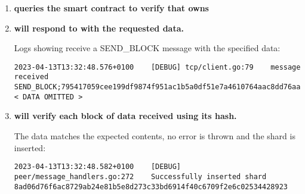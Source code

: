 \begin{enumerate}[itemsep=2.5pt]
  Logs showing  choose a block and send a request for it :

\begin{lstlisting}[breaklines=true, postbreak=\mbox{\textcolor{red}{$\hookrightarrow$}\space}]
2023-04-13T13:32:48.197+0100	[DEBUG]	games/download.go:339	Requesting file downloads\User WT-1.0\test.txt for game 795417059cee199df9874f951ac1b5a0df51e7a4610764aac8dd76aa3ff27664
2023-04-13T13:32:48.197+0100	[DEBUG]	games/download.go:343	Requesting shard 8ad06d76f6ac8729ab24e81b5e8d273c33bd6914f40c6709f2e6c02534428923 for file downloads\User WT-1.0\test.txt in game 795417059cee199df9874f951ac1b5a0df51e7a4610764aac8dd76aa3ff27664
...
2023-04-13T13:32:48.197+0100	[DEBUG]	peer/requests.go:14	Processing request for block 8ad06d76f6ac8729ab24e81b5e8d273c33bd6914f40c6709f2e6c02534428923
...
2023-04-13T13:32:48.197+0100	[DEBUG]	tcp/client.go:93	Sending BLOCK;795417059cee199df9874f951ac1b5a0df51e7a4610764aac8dd76aa3ff27664; 8ad06d76f6ac8729ab24e81b5e8d273c33bd6914f40c6709f2e6c02534428923
\end{lstlisting}

  \item\textbf{ queries the smart contract to verify that  owns }

  \item \textbf{ will respond to  with the requested data.}
  
  Logs showing  receive a SEND\_BLOCK message with the specified data:

\begin{lstlisting}[breaklines=true, postbreak=\mbox{\textcolor{red}{$\hookrightarrow$}\space}]
2023-04-13T13:32:48.576+0100	[DEBUG]	tcp/client.go:79	message received SEND_BLOCK;795417059cee199df9874f951ac1b5a0df51e7a4610764aac8dd76aa3ff27664;< DATA OMITTED >
\end{lstlisting}

  \item \textbf{ will verify each block of data received using its hash.}
  
  The data matches the expected contents, no error is thrown and the shard is inserted:
  
\begin{lstlisting}[breaklines=true, postbreak=\mbox{\textcolor{red}{$\hookrightarrow$}\space}]
2023-04-13T13:32:48.582+0100	[DEBUG]	peer/message_handlers.go:272	Successfully inserted shard 8ad06d76f6ac8729ab24e81b5e8d273c33bd6914f40c6709f2e6c02534428923
\end{lstlisting}



\end{enumerate}
